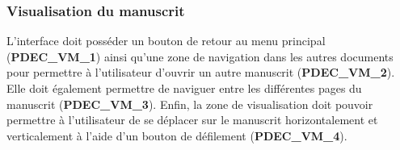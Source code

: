 \subsubsection{Visualisation du manuscrit}

L’interface doit posséder un bouton de retour au menu principal
(\textbf{PDEC\_VM\_1}) ainsi qu’une zone de navigation dans les autres
documents pour permettre à l’utilisateur d’ouvrir un autre manuscrit
(\textbf{PDEC\_VM\_2}). Elle doit également permettre de naviguer entre les
différentes pages du manuscrit (\textbf{PDEC\_VM\_3}). Enfin, la zone de
visualisation doit pouvoir permettre à l’utilisateur de se déplacer sur le
manuscrit horizontalement et verticalement à l’aide d’un bouton de
défilement (\textbf{PDEC\_VM\_4}).
